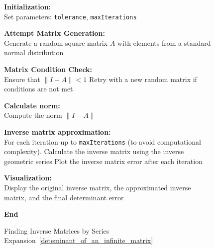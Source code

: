 \begin{figure}[H]
    \centering
    \begin{algorithm}[H]
        \caption{Finding Inverse Matrices by Series Expansion~\ref{deteminant_of_an_infinite_matrix}}
        \label{alg:inverse_matrices}


        \textbf{Initialization:}\\
        Set parameters: \texttt{tolerance}, \texttt{maxIterations}\;
        
        \textbf{Attempt Matrix Generation:}\\
        Generate a random square matrix $A$ with elements from a standard normal distribution\;
        
        \textbf{Matrix Condition Check:}\\
        Ensure that $\|I - A\| < 1$\;
        Retry with a new random matrix if conditions are not met\;


        \textbf{Calculate norm:}\\
        Compute the norm $\|I - A\|$\;



        \textbf{Inverse matrix approximation:}\\
        For each iteration up to \texttt{maxIterations} (to avoid computational complexity).
        Calculate the inverse matrix using the inverse geometric series \;
        Plot the inverse matrix error after each iteration \;

        \textbf{Visualization:}\\
        Display the original inverse matrix, the approximated inverse matrix, and the final determinant error\;



        \textbf{End}
    \end{algorithm}
\end{figure}
